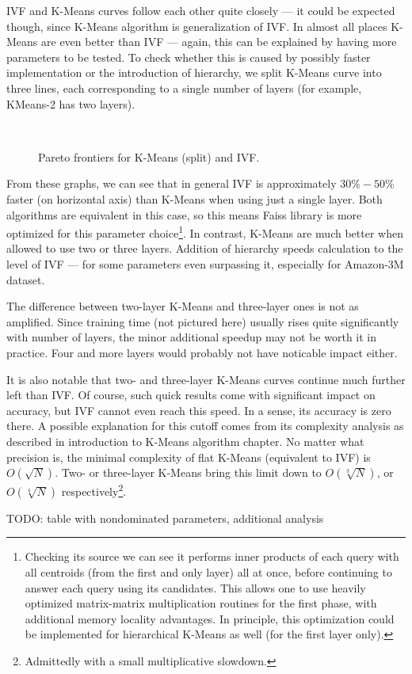 IVF and K-Means curves follow each other quite closely --- it could be expected though,
since K-Means algorithm is generalization of IVF. In almost all places K-Means are even
better than IVF --- again, this can be explained by having more parameters to be tested.
To check whether this is caused by possibly faster implementation or the introduction of
hierarchy, we split K-Means curve into three lines, each corresponding to a single
number of layers (for example, KMeans-2 has two layers).

\begin{figure}[H]
	\centering
	\\
	\caption{Pareto frontiers for K-Means (split) and IVF.}
\end{figure}

From these graphs, we can see that in general IVF is approximately $30\% - 50\%$ faster
(on horizontal axis) than K-Means when using just a single layer. Both algorithms are 
equivalent in this case, so this means Faiss library is more optimized for this parameter 
choice\footnote{
Checking its source we can see it performs inner products of each query with all centroids
(from the first and only layer) all at once, before continuing to answer each query 
using its candidates. This allows one to use heavily optimized matrix-matrix multiplication
routines for the first phase, with additional memory locality advantages. 
In principle, this optimization
could be implemented for hierarchical K-Means as well (for the first layer only).
}.
In contrast, K-Means are much better when allowed to use two or three layers. Addition
of hierarchy speeds calculation to the level of IVF --- for some parameters even surpassing
it, especially for Amazon-3M dataset.

The difference between two-layer K-Means and three-layer ones is not as amplified. Since
training time (not pictured here) usually rises quite significantly with number of layers,
the minor additional speedup may not be worth it in practice. Four and more layers
would probably not have noticable impact either.

It is also notable that two- and three-layer K-Means curves continue much further left
than IVF. Of course, such quick results come with significant impact on accuracy, but
IVF cannot even reach this speed. In a sense, its accuracy is zero there.
A possible explanation for this cutoff comes from its complexity analysis as described
in introduction to K-Means algorithm chapter. No matter what precision is, the minimal
complexity of flat K-Means (equivalent to IVF) is $O(\sqrt{N})$. Two- or three-layer
K-Means bring this limit down to $O(\sqrt[3]{N})$, or $O(\sqrt[4]{N})$ 
respectively\footnote{Admittedly with a small multiplicative slowdown.}.

TODO: table with nondominated parameters, additional analysis



